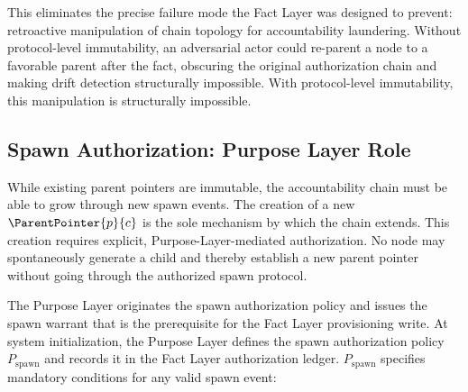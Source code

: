 This eliminates the precise failure mode the Fact Layer was designed to prevent: retroactive manipulation of chain topology for accountability laundering. Without protocol-level immutability, an adversarial actor could re-parent a node to a favorable parent after the fact, obscuring the original authorization chain and making drift detection structurally impossible. With protocol-level immutability, this manipulation is structurally impossible.

\subsection{Spawn Authorization: Purpose Layer Role}
\label{sec:purpose-layer-spawn-authorization}

While existing parent pointers are immutable, the accountability chain must be able to grow through new spawn events. The creation of a new $\ParentPointer{p}{c}$ is the sole mechanism by which the chain extends. This creation requires explicit, Purpose-Layer-mediated authorization. No node may spontaneously generate a child and thereby establish a new parent pointer without going through the authorized spawn protocol.

The Purpose Layer originates the spawn authorization policy and issues the spawn warrant that is the prerequisite for the Fact Layer provisioning write. At system initialization, the Purpose Layer defines the spawn authorization policy $P_{\mathrm{spawn}}$ and records it in the Fact Layer authorization ledger. $P_{\mathrm{spawn}}$ specifies mandatory conditions for any valid spawn event:

